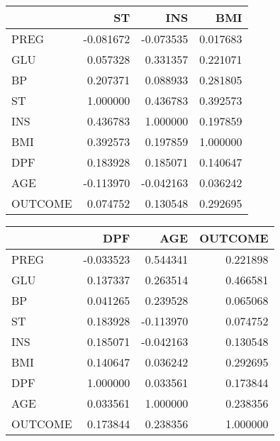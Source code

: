 \documentclass[12pt]{article}
\begin{document}
\begin{tabular}{lrrr}
\toprule
{} &        ST &       INS &       BMI \\
\midrule
PREG    & -0.081672 & -0.073535 &  0.017683 \\
GLU     &  0.057328 &  0.331357 &  0.221071 \\
BP      &  0.207371 &  0.088933 &  0.281805 \\
ST      &  1.000000 &  0.436783 &  0.392573 \\
INS     &  0.436783 &  1.000000 &  0.197859 \\
BMI     &  0.392573 &  0.197859 &  1.000000 \\
DPF     &  0.183928 &  0.185071 &  0.140647 \\
AGE     & -0.113970 & -0.042163 &  0.036242 \\
OUTCOME &  0.074752 &  0.130548 &  0.292695 \\
\bottomrule
\end{tabular}


\begin{tabular}{lrrr}
\caption{hel}
\toprule
{} &       DPF &       AGE &   OUTCOME \\
\midrule
PREG    & -0.033523 &  0.544341 &  0.221898 \\
GLU     &  0.137337 &  0.263514 &  0.466581 \\
BP      &  0.041265 &  0.239528 &  0.065068 \\
ST      &  0.183928 & -0.113970 &  0.074752 \\
INS     &  0.185071 & -0.042163 &  0.130548 \\
BMI     &  0.140647 &  0.036242 &  0.292695 \\
DPF     &  1.000000 &  0.033561 &  0.173844 \\
AGE     &  0.033561 &  1.000000 &  0.238356 \\
OUTCOME &  0.173844 &  0.238356 &  1.000000 \\
\bottomrule
\end{tabular}
\end{document}
